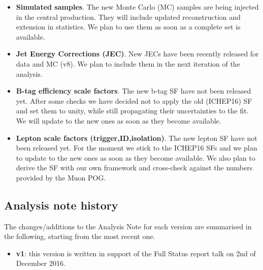 \begin{itemize}
\item \textbf{Simulated samples}. The new Monte Carlo (MC) samples are being injected in the central production.
  They will include updated reconstruction and extension in statistics. We plan to use them as soon as a complete set is available.
\item \textbf{Jet Energy Corrections (JEC)}. New JECs have been recently released for data and MC (v8). 
  We plan to include them in the next iteration of the analysis. 
\item \textbf{B-tag efficiency scale factors}. The new b-tag SF have not been released yet. 
  After some checks we have decided not to apply the old (ICHEP16) SF and set them to unity, while still propagating their uncertainties to the fit.
  We will update to the new ones as soon as they become available.
\item \textbf{Lepton scale factors (trigger,ID,isolation)}. The new lepton SF have not been released yet. 
  For the moment we stick to the ICHEP16 SFs and we plan to update to the new ones as soon as they become available. 
  We also plan to derive the SF with our own framework and cross-check against the numbers provided by the Muon POG.
\end{itemize}


\subsection{Analysis note history}
\label{sec:an-history}
The changes/additions to the Analysis Note for each version are summarised in the following, starting from the most recent one.

\begin{itemize}
\item \textbf{v1}: this version is written in support of the Full Status report talk on 2nd of December 2016.
\end{itemize}


